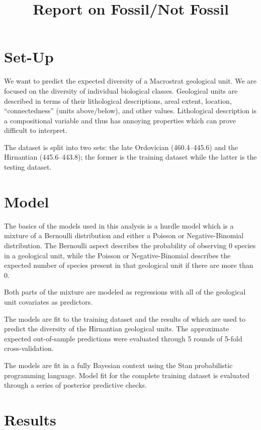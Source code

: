 \documentclass[12pt,letterpaper]{article}
\title{Report on Fossil/Not Fossil}
\begin{document}
\maketitle

\section{Set-Up}

We want to predict the expected diversity of a Macrostrat geological unit. We are focused on the diversity of individual biological classes. Geological units are described in terms of their lithological descriptions, areal extent, location, ``connectedness'' (units above/below), and other values. Lithological description is a compositional variable and thus has annoying properties which can prove difficult to interpret. 

The dataset is split into two sets: the late Ordovician (460.4--445.6) and the Hirnantian (445.6--443.8); the former is the training dataset while the latter is the testing dataset.


\section{Model}

The basics of the models used in this analysis is a hurdle model which is a mixture of a Bernoulli distribution and either a Poisson or Negative-Binomial distribution. The Bernoulli aspect describes the probability of observing 0 species in a geological unit, while the Poisson or Negative-Binomial describes the expected number of species present in that geological unit if there are more than 0.

Both parts of the mixture are modeled as regressions with all of the geological unit covariates as predictors.

The models are fit to the training dataset and the results of which are used to predict the diversity of the Hirnantian geological units. The approximate expected out-of-sample predictions were evaluated through 5 rounds of 5-fold cross-validation.

The models are fit in a fully Bayesian context using the Stan probabilistic programming language. Model fit for the complete training dataset is evaluated through a series of posterior predictive checks.


\section{Results}
\end{document}
